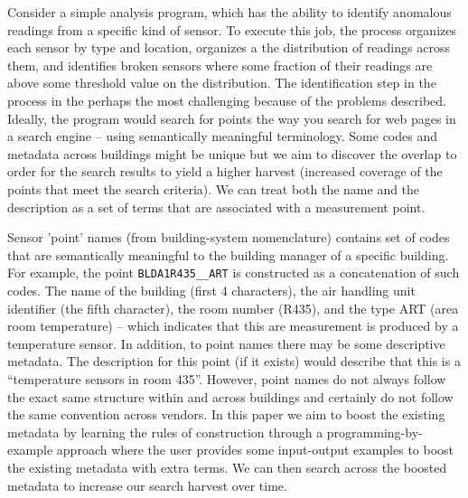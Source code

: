 Consider a simple analysis program, which has the ability
to identify anomalous readings from a specific kind of sensor. To execute this job, 
the process organizes each sensor by type and location, organizes a the distribution of
readings across them, and identifies broken sensors where some fraction of
their readings are above some threshold value on the distribution.
The identification step in the process in the perhaps the most challenging 
because of the problems described.  Ideally, the program would search for points the
way you search for web pages in a search engine -- using semantically meaningful 
terminology. Some codes and metadata across buildings might be unique but we aim 
to discover the overlap to order for the search results to yield a higher harvest
(increased coverage of the points that meet the search criteria).
We can treat both the name and the description as a set of terms that are associated 
with a measurement point.

Sensor 'point' names (from building-system nomenclature) contains set of codes that are 
semantically meaningful to the building manager of a specific building.
For example, the point \texttt{BLDA1R435\_\_ART} is constructed as a concatenation of such codes.
The name of the building (first 4 characters), the air handling unit identifier (the 
fifth character), the room number (R435), and the type ART (area room temperature) -- which 
indicates that this are measurement is produced by a temperature sensor. In addition,
to point names there may be some descriptive metadata.  The description for this point (if it 
exists) would describe that this is a ``temperature sensors in room 435''.
However, point names do not always follow the exact same structure within and across
buildings and certainly do not 
follow the same convention across vendors.  
In this paper we aim to boost the existing 
metadata by learning the rules of construction through a programming-by-example
approach where the user provides some input-output examples to boost the existing
metadata with extra terms.  We can then search across the boosted metadata to increase
our search harvest over time.


